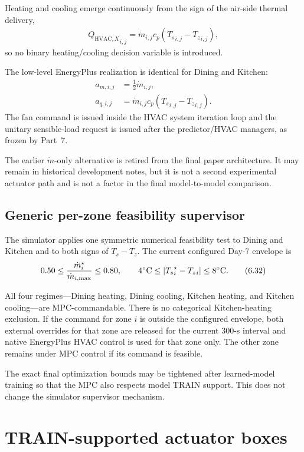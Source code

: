 \documentclass[11pt]{article}
\newcommand{\Ts}{T_s}
\newcommand{\Tz}{T_z}
\newcommand{\mdot}{\dot m}
\newcommand{\QHX}{Q_{\mathrm{HVAC},X}}
\begin{document}
Heating and cooling emerge continuously from the sign of the air-side thermal
delivery,
\begin{align}
{\QHX}_{i,j}
=
\mdot_{i,j}c_p({\Ts}_{i,j}-{\Tz}_{i,j}),
\end{align}
so no binary heating/cooling decision variable is introduced.

The low-level EnergyPlus realization is identical for Dining and Kitchen:
\begin{align}
a_{m,i,j}
&=
\tfrac12\mdot_{i,j},
\\
a_{q,i,j}
&=
\mdot_{i,j}c_p({\Ts}_{i,j}-{\Tz}_{i,j}).
\tag{6.31}
\end{align}
The fan command is issued inside the HVAC system iteration loop and the unitary
sensible-load request is issued after the predictor/HVAC managers, as frozen by
Part~7.

The earlier \(\mdot\)-only alternative is retired from the final paper
architecture.  It may remain in historical development notes, but it is not a
second experimental actuator path and is not a factor in the final
model-to-model comparison.

\subsection{Generic per-zone feasibility supervisor}

The simulator applies one symmetric numerical feasibility test to Dining and
Kitchen and to both signs of \({\Ts}-{\Tz}\).  The current configured
Day-7 envelope is
\begin{align}
0.50
\le
\frac{\mdot_i^\star}{\mdot_{i,\max}}
\le
0.80,
\qquad
4^\circ{\rm C}
\le
|{\Ts}_i^\star-{\Tz}_i|
\le
8^\circ{\rm C}.
\tag{6.32}
\end{align}

All four regimes---Dining heating, Dining cooling, Kitchen heating, and Kitchen
cooling---are MPC-commandable.  There is no categorical Kitchen-heating
exclusion.  If the command for zone \(i\) is outside the configured envelope,
both external overrides for that zone are released for the current 300-s
interval and native EnergyPlus HVAC control is used for that zone only.  The
other zone remains under MPC control if its command is feasible.

The exact final optimization bounds may be tightened after learned-model
training so that the MPC also respects model TRAIN support.  This does not
change the simulator supervisor mechanism.

\section{TRAIN-supported actuator boxes}
\end{document}
